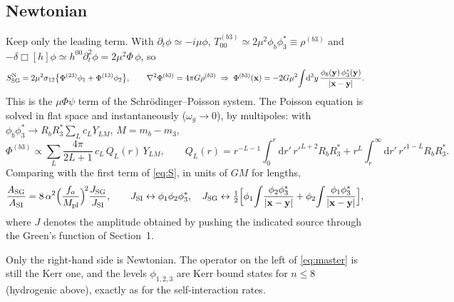 \documentclass[11pt]{article}
\newcommand{\bx}{\mathbf{x}}\newcommand{\by}{\mathbf{y}}
\newcommand{\dd}{\mathrm{d}}
\newcommand{\Mpl}{M_{\rm pl}}
\begin{document}
\subsection{Newtonian}
Keep only the leading term. With $\partial_t\phi\simeq-i\mu\phi$, $T^{(b3)}_{00}\simeq2\mu^2\phi_b\phi_3^*\equiv\rho^{(b3)}$ and
$-\delta\Box[h]\phi\simeq h^{00}\partial_t^2\phi=2\mu^2\Phi\,\phi$, so
\begin{equation}
S_{\rm SG}^{\rm N}=2\mu^2\sigma_{12}\big\{\Phi^{(23)}\phi_1+\Phi^{(13)}\phi_2\big\},\qquad
\nabla^2\Phi^{(b3)}=4\pi G\rho^{(b3)}\;\Rightarrow\;
\Phi^{(b3)}(\bx)=-2G\mu^2\!\int\!\dd^3y\,\frac{\phi_b(\by)\,\phi_3^*(\by)}{|\bx-\by|}. \label{eq:newton}
\end{equation}
This is the $\mu\Phi\psi$ term of the Schr\"odinger--Poisson system. The Poisson equation is solved in flat space and instantaneously
($\omega_g\to0$), by multipoles: with $\phi_b\phi_3^*\to R_bR_3^*\sum_Lc_LY_{LM}$, $M=m_b-m_3$,
\begin{equation}
\Phi^{(b3)}\propto\sum_L\frac{4\pi}{2L+1}\,c_L\,Q_L(r)\,Y_{LM},\qquad
Q_L(r)=r^{-L-1}\!\!\int_0^r\!\dd r'\,r'^{L+2}R_bR_3^*+r^{L}\!\!\int_r^\infty\!\dd r'\,r'^{1-L}R_bR_3^* .
\end{equation}
Comparing with the first term of \eqref{eq:S}, in units of $GM$ for lengths,
\begin{equation}
\frac{A_{\rm SG}}{A_{\rm SI}}=8\,\alpha^2\Big(\frac{f_a}{\Mpl}\Big)^{\!2}\frac{J_{\rm SG}}{J_{\rm SI}},\qquad
J_{\rm SI}\leftrightarrow\phi_1\phi_2\phi_3^*,\quad
J_{\rm SG}\leftrightarrow\tfrac12\Big[\phi_1\!\int\!\frac{\phi_2\phi_3^*}{|\bx-\by|}+\phi_2\!\int\!\frac{\phi_1\phi_3^*}{|\bx-\by|}\Big],
\end{equation}
where $J$ denotes the amplitude obtained by pushing the indicated source through the Green's function of Section~1.

Only the right-hand side is Newtonian. The operator on the left of \eqref{eq:master} is still the Kerr one, and the levels
$\phi_{1,2,3}$ are Kerr bound states for $n\le8$ (hydrogenic above), exactly as for the self-interaction rates.
\end{document}

